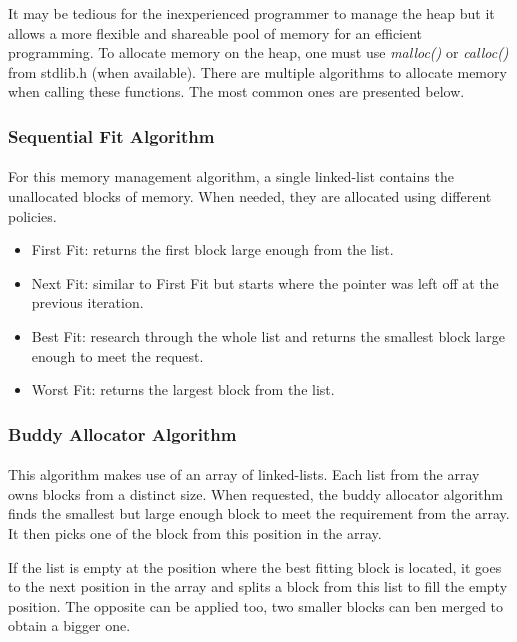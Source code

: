 It may be tedious for the inexperienced programmer to manage the heap
    but it allows a more flexible and shareable pool of memory for an efficient programming.
To allocate memory on the heap, one must use \textit{malloc()} or \textit{calloc()} from stdlib.h (when available).
There are multiple algorithms to allocate memory when calling these functions.
The most common ones are presented below.

\subsubsection{Sequential Fit Algorithm}
\paragraph{}
For this memory management algorithm, a single linked-list contains the unallocated blocks of memory.
When needed, they are allocated using different policies.
\begin{itemize}
    \item First Fit: returns the first block large enough from the list.
    \item Next Fit: similar to First Fit but starts where the pointer was left off at the previous iteration.
    \item Best Fit: research through the whole list and returns the smallest block large enough to meet the request.
    \item Worst Fit: returns the largest block from the list.
\end{itemize}

\subsubsection{Buddy Allocator Algorithm}
\paragraph{}
This algorithm makes use of an array of linked-lists.
Each list from the array owns blocks from a distinct size.
When requested, the buddy allocator algorithm finds the smallest but large enough block to meet the requirement from the array.
It then picks one of the block from this position in the array.

If the list is empty at the position where the best fitting block is located, it goes to the next position in the array
and splits a block from this list to fill the empty position.
The opposite can be applied too, two smaller blocks can ben merged to obtain a bigger one.

